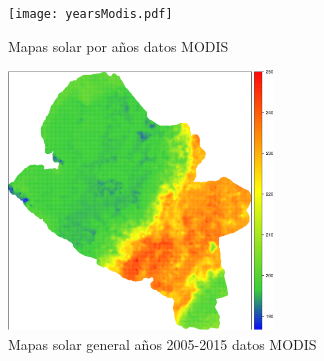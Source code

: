 \begin{figure}
  \centering
  \texttt{[image: yearsModis.pdf]}
  \caption{Mapas solar por años datos MODIS}
  \label{fig:solarAnio:modis}
\end{figure}

\begin{figure}
  \centering
  \includegraphics[width = 7cm]{generalModis.pdf}
  \caption{Mapas solar general años 2005-2015 datos MODIS}
  \label{fig:solarTotal:modis}
\end{figure}
